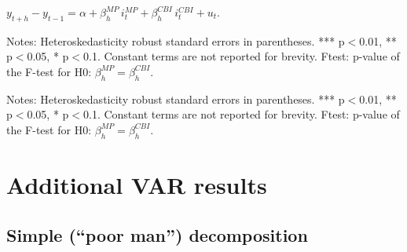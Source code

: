 \documentclass[a4paper,12pt]{article}
\newcommand{\pathTables}{../workm_lp/}
\begin{document}

\begin{table}[!htbp]
\begin{center}
\caption{The effect of Fed monetary policy and information shocks on financial variables}\label{tab: reg fed shocks}
$y^{}_{t+h}-y^{}_{t-1} = \alpha + \beta^{MP}_h\, i^{MP}_t + \beta^{CBI}_h\, i^{CBI}_t + u_t.$
\small
{}
\end{center}\footnotesize
Notes: Heteroskedasticity robust standard errors in parentheses. *** p$<$0.01, ** p$<$0.05, * p$<$0.1.
Constant terms are not reported for brevity.
Ftest: p-value of the F-test for H0: $\beta^{MP}_h=\beta^{CBI}_h$.
\end{table}

\begin{table}[!htbp]\addtocounter{table}{-1}\small
\begin{center}
\caption{Continued}
\end{center}\footnotesize
Notes: Heteroskedasticity robust standard errors in parentheses. *** p$<$0.01, ** p$<$0.05, * p$<$0.1.
Constant terms are not reported for brevity.
Ftest: p-value of the F-test for H0: $\beta^{MP}_h=\beta^{CBI}_h$.
\end{table}


\clearpage

\section{Additional VAR results}\label{sec: app var}

\subsection{Simple (``poor man'') decomposition}
\end{document}
